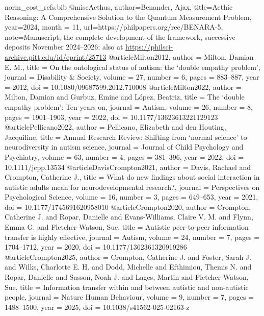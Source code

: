 \begin{filecontents}[overwrite]{norm_cost_refs.bib}
@misc{Aethus, author={Benander, Ajax}, title={Aethic Reasoning: A Comprehensive Solution to the Quantum Measurement Problem}, year={2024}, month = {11}, url={https://philpapers.org/rec/BENARA-5}, note={Manuscript; the complete development of the framework, successive deposits November 2024--2026; also at \url{https://philsci-archive.pitt.edu/id/eprint/25713}}}
@article{Milton2012,
  author = {Milton, Damian E. M.},
  title = {On the ontological status of autism: the `double empathy problem'},
  journal = {Disability \& Society}, volume = {27}, number = {6}, pages = {883--887}, year = {2012},
  doi = {10.1080/09687599.2012.710008}}
@article{Milton2022,
  author = {Milton, Damian and Gurbuz, Emine and L{\'o}pez, Beatriz},
  title = {The `double empathy problem': Ten years on},
  journal = {Autism}, volume = {26}, number = {8}, pages = {1901--1903}, year = {2022},
  doi = {10.1177/13623613221129123}}
@article{Pellicano2022,
  author = {Pellicano, Elizabeth and den Houting, Jacquiline},
  title = {Annual Research Review: Shifting from `normal science' to neurodiversity in autism science},
  journal = {Journal of Child Psychology and Psychiatry}, volume = {63}, number = {4}, pages = {381--396}, year = {2022},
  doi = {10.1111/jcpp.13534}}
@article{DavisCrompton2021,
  author = {Davis, Rachael and Crompton, Catherine J.},
  title = {What do new findings about social interaction in autistic adults mean for neurodevelopmental research?},
  journal = {Perspectives on Psychological Science}, volume = {16}, number = {3}, pages = {649--653}, year = {2021},
  doi = {10.1177/1745691620958010}}
@article{Crompton2020,
  author = {Crompton, Catherine J. and Ropar, Danielle and Evans-Williams, Claire V. M. and Flynn, Emma G. and Fletcher-Watson, Sue},
  title = {Autistic peer-to-peer information transfer is highly effective},
  journal = {Autism}, volume = {24}, number = {7}, pages = {1704--1712}, year = {2020},
  doi = {10.1177/1362361320919286}}
@article{Crompton2025,
  author = {Crompton, Catherine J. and Foster, Sarah J. and Wilks, Charlotte E. H. and Dodd, Michelle and Efthimiou, Themis N. and Ropar, Danielle and Sasson, Noah J. and Lages, Martin and Fletcher-Watson, Sue},
  title = {Information transfer within and between autistic and non-autistic people},
  journal = {Nature Human Behaviour}, volume = {9}, number = {7}, pages = {1488--1500}, year = {2025},
  doi = {10.1038/s41562-025-02163-z}}

\end{filecontents}
